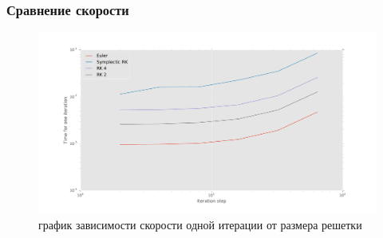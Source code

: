 \documentclass[t]{beamer}
\begin{document}
\begin{frame}
    \frametitle{Сравнение скорости}
    \begin{figure}[h]
        \centernig
        \includegraphics[width=\textwidth]{speedComparsion}
        \caption{график зависимости скорости одной итерации от размера решетки}
    \end{figure}
\end{frame}

\begin{frame}
	\begin{center}
	\end{center}
\end{frame}

\ITMOthankspage
\end{document}
